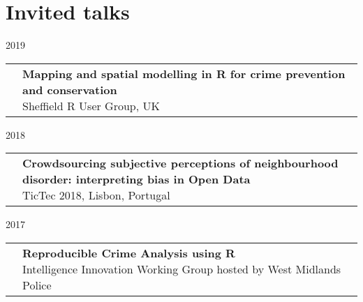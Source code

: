 \documentclass[10pt,a4paper,]{article}
\makeatletter
\def\briefitem#1#2#3{
#2 & \parbox[t]{0.85\textwidth}{%
      \textbf{#1}\\[-0.1cm]{\footnotesize #3}}\\[0.4cm]}
\def\briefsection#1{\begin{longtable}{@{\extracolsep{\fill}}ll}#1\end{longtable}}
\makeatother
\begin{document}
\hypertarget{invited-talks}{%
\section{Invited talks}\label{invited-talks}}

2019
\briefsection{\briefitem{Mapping and spatial modelling in R for crime prevention and conservation}{}{Sheffield R User Group, UK}\briefitem{The role of innovative data collection methods in advancing understanding, and the importance of considering the biases within}{}{Women in Data Science: Zurich, Switzerland}\briefitem{Keynote: Data-driven insights in law: opportunities and cautions}{}{Berlin Legal Tech Conference 2019, Germany}\briefitem{The role of innovative data collection methods in advancing behavioural understanding}{}{Cognitive and Decision Sciences, University of Basel, Switzerland}\briefitem{The role of innovative data collection methods in advancing criminological understanding}{}{Manchester Metropolitan University Big Data Centre Seminar Series, UK}}

2018
\briefsection{\briefitem{Crowdsourcing subjective perceptions of neighbourhood disorder: interpreting bias in Open Data}{}{TicTec 2018, Lisbon, Portugal}\briefitem{Interdisciplinary Alchemy: Data Science + Social Science}{}{Data Kind UK}\briefitem{Everybody Lies but Not Everybody Tweets: Making Sense of the Bias in Your Data}{}{Advances in Data Science conference, Manchester, UK}}

2017
\briefsection{\briefitem{Reproducible Crime Analysis using R}{}{Intelligence Innovation Working Group hosted by West Midlands Police}\briefitem{Building Interactive Data Visualizations}{}{Manchester Methods Fair, UK}\briefitem{Using open data in the social sciences}{}{Her+Data Meetup, Manchester, UK}\briefitem{What is Crowdsourced Data?}{}{Methods@Manchester seminar on research methods in social sciences, Manchester,UK}\briefitem{Eyes and Apps on the Street}{}{Stockholm Royal Institute of Technology (KTH), Sweden}\briefitem{Keynote: Making Sense of Data using Methods}{}{Methods North West Launch Conference, Manchester, UK}\briefitem{Using R for Crime Analysis}{}{Greater Manchester Police, Force HQ, Manchester, UK}\briefitem{Mapping   fear    of  crime   as  a   context-dependent   everyday    experience  that    varies  in  space   and time}{}{Horizon 2020 Project MARGIN conference, Budapest, Hungary}\briefitem{Using open data to evaluate current approaches to cabs tasking}{}{11th International Crime Science Conference, London, UK}\briefitem{Fighting Crime (and other bad things) on the transport network}{}{Manchester R User Group meetup}}
\end{document}
